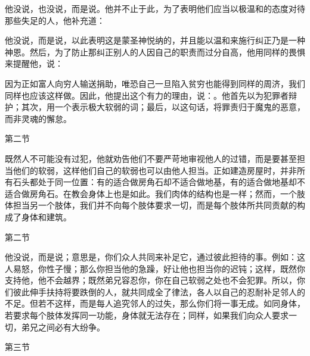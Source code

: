 他没说，也没说，而是说。他并不止于此，为了表明他们应当以极温和的态度对待那些失足的人，他补充道：\par

\par

他没说，而是说，以此表明这是蒙圣神悦纳的，并且能以温和来施行纠正乃是一种神恩。然后，为了防止那纠正别人的人因自己的职责而过分自高，他用同样的畏惧来提醒他，说：\par

\par

因为正如富人向穷人输送捐助，唯恐自己一旦陷入贫穷也能得到同样的周济，我们同样也应该这样做。因此，他提出这个有力的理由，说：。他首先以为犯罪者辩护；其次，用一个表示极大软弱的词；最后，以这句话，将罪责归于魔鬼的恶意，而非灵魂的懈怠。\par

第二节  \par

既然人不可能没有过犯，他就劝告他们不要严苛地审视他人的过错，而是要甚至担当他们的软弱，这样他们自己的软弱也可以由他人担当。正如建造房屋时，并非所有石头都处于同一位置：有的适合做房角石却不适合做地基，有的适合做地基却不适合做房角石。在教会身体上也是如此。我们肉体的结构也是一样；然而，一个肢体担当另一个肢体，我们并不向每个肢体要求一切，而是每个肢体所共同贡献的构成了身体和建筑。\par

第二节  \par

他没说，而是说；意思是，你们众人共同来补足它，通过彼此担待的事。例如：这人易怒，你性子慢；那么你担当他的急躁，好让他也担当你的迟钝；这样，既然你支持他，他不会越界；既然弟兄容忍你，你在自己软弱之处也不会犯罪。所以，你们彼此伸手扶持将要跌倒的人，就共同成全了律法，各人以自己的忍耐补足邻人的不足。但若不这样，而是每人追究邻人的过失，那么你们将一事无成。如同身体，若要求每个肢体发挥同一功能，身体就无法存在；同样，如果我们向众人要求一切，弟兄之间必有大纷争。\par

第三节  \par

